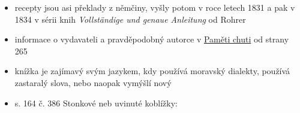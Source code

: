 \begin{itemize}
\begin{itemize}
    \begin{itemize}
    \tightlist
    \item
      \href{https://ndk.cz/uuid/uuid:982c2490-b9f8-11dc-a1aa-000d606f5dc6}{Co
      hrdlo ráčj, neb, 500 rozličných pokrmů, pochoutek, rosolů}:
    \end{itemize}
  \item
    recepty jsou asi překlady z němčiny, vyšly potom v roce letech 1831
    a pak v 1834 v sérii knih \emph{Vollständige und genaue Anleitung}
    od Rohrer
  \item
    informace o vydavateli a pravděpodobný autorce v
    \href{https://kulturni-dejiny.slu.cz/data/uploads/067/upvysledky/pamet_chuti_odborna-kniha_uplatnny_2020.pdf}{Paměti
    chuti} od strany 265
  \item
    knížka je zajímavý svým jazykem, kdy používá moravský dialekty,
    používá zastaralý slova, nebo naopak vymýšlí nový
  \item
    s. 164  č. 386 Stonkové neb uvinuté koblížky:


\end{itemize}
\end{itemize}
